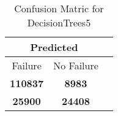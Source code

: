 \begin{table}[] 
\caption{Confusion Matric for DecisionTrees5} 
\label{Table: Prediction Accuracy-DMDDecisionTrees5OnlySunEKF-combinationReflection-Reflection} 
\centering 
\begin{tabular} 
 {@{}ccc@{}} 
\toprule 
\multicolumn{2}{c}{\textbf{Predicted}}
 \\ \midrule 
\multicolumn{1}{|c|}{Failure} & 
\multicolumn{1}{c|}{No Failure}
 \\ \midrule 
\multicolumn{1}{|c|}{\color{green}\textbf{110837}} & 
\multicolumn{1}{c|}{\color{red}\textbf{8983}}
 \\ \midrule 
\multicolumn{1}{|c|}{\color{red}\textbf{25900}} & 
\multicolumn{1}{c|}{\color{green}\textbf{24408}}
 \\ \bottomrule 
\end{tabular} 
\end{table} 
